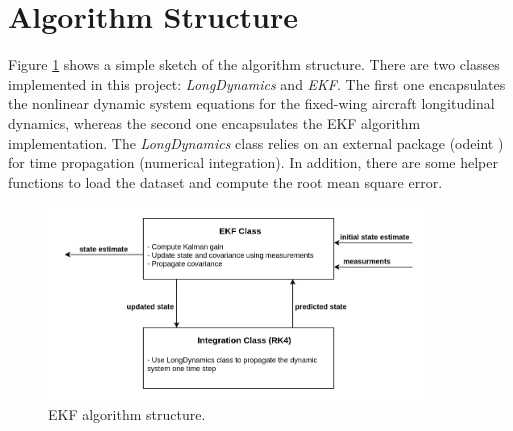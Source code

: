 \documentclass{article}
\begin{document}
\section{Algorithm Structure}
Figure \ref{Fig:EKF_Algorithm_Sketch} shows a simple sketch of the algorithm structure. 
There are two classes implemented in this project: \textit{LongDynamics} and \textit{EKF}. 
The first one encapsulates the nonlinear dynamic system equations for the fixed-wing aircraft longitudinal dynamics, 
whereas the second one encapsulates the EKF algorithm implementation. The \textit{LongDynamics} class relies on an external 
package (odeint \cite{odeint_website}) for time propagation (numerical integration). 
In addition, there are some helper functions to load the dataset and compute the root mean square error.
\begin{figure}[h]
    \centering
    \includegraphics[width=0.9\textwidth]{EKF_Algorithm.png}
    \caption{EKF algorithm structure.}
    \label{Fig:EKF_Algorithm_Sketch}
\end{figure}
\end{document}

